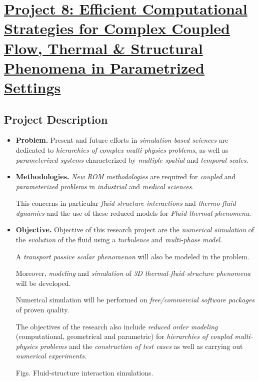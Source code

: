 \documentclass{book}
\numberwithin{equation}{section}
\begin{document}

\chapter{\href{https://www.romsoc.eu/efficienct-computational-strategies-for-complex-coupled-flow-thermal-and-structural-phenomena-in-parametrized-settings/}{Project 8: Efficient Computational Strategies for Complex Coupled Flow, Thermal \& Structural Phenomena in Parametrized Settings}}

\section{Project Description}
\begin{itemize}
    \item \textbf{Problem.} Present and future efforts in \textit{simulation-based sciences} are dedicated to \textit{hierarchies of complex multi-physics problems}, as well as \textit{parameterized systems} characterized by \textit{multiple spatial} and \textit{temporal scales}.
    \item \textbf{Methodologies.} \textit{New ROM methodologies} are required for \textit{coupled} and \textit{parameterized problems} in \textit{industrial} and \textit{medical sciences}.
    
    This concerns in particular \textit{fluid-structure interactions} and \textit{thermo-fluid-dynamics} and the use of these reduced models for \textit{Fluid-thermal phenomena}.
    \item \textbf{Objective.} Objective of this research project are the \textit{numerical simulation} of the \textit{evolution} of the fluid using a \textit{turbulence} and \textit{multi-phase model}.
    
    A \textit{transport passive scalar phenomenon} will also be modeled in the problem.
    
    Moreover, \textit{modeling} and \textit{simulation} of \textit{3D thermal-fluid-structure phenomena} will be developed.
    
    Numerical simulation will be performed on \textit{free/commercial software packages} of proven quality.
    
    The objectives of the research also include \textit{reduced order modeling} (computational, geometrical and parametric) for \textit{hierarchies of coupled multi-physics problems} and the \textit{construction of test cases} as well as carrying out \textit{numerical experiments}.
    
    \textsf{Figs. Fluid-structure interaction simulations.}    
\end{itemize}
\end{document}
